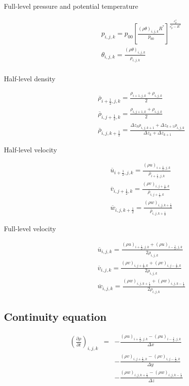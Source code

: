 \begin{description}
\item[Full-level pressure and potential temperature]
\begin{eqnarray}
&&p_{i,j,k}=p_{00}\left[\frac{(\rho \theta)_{i,j,k} R^*}{p_{00}} \right]^{\frac{c_{p}^*}{c_{p}^*- R^*}}\\
&&\theta_{i,j,k} = \frac{(\rho \theta)_{i,j,k}}{\rho_{i,j,k}} \label{eq:theta full} \\
\end{eqnarray}
\item[Half-level density]
\begin{eqnarray}
&&  \overline{\rho}_{i+\frac{1}{2},j,k} = \frac{\rho_{i+1,j,k}+\rho_{i,j,k}}{2} \label{eq:rho half i} \\
&&  \overline{\rho}_{i,j+\frac{1}{2},k} = \frac{\rho_{i,j+1,k}+\rho_{i,j,k}}{2} \label{eq:rho half j} \\
&&  \overline{\rho}_{i,j,k+\frac{1}{2}} = \frac{\Delta z_k\rho_{i,j,k+1}+\Delta z_{k+1}\rho_{i,j,k}}{\Delta z_k + \Delta z_{k+1}} \label{eq:rho half k}
\end{eqnarray}
\item[Half-level velocity]
\begin{eqnarray}
&&  \overline{u}_{i+\frac{1}{2},j,k} = \frac{(\rho u)_{i+\frac{1}{2},j,k}}{\overline{\rho}_{i+\frac{1}{2},j,k}}\\
&&  \overline{v}_{i,j+\frac{1}{2},k} = \frac{(\rho v)_{i,j+\frac{1}{2},k}}{\overline{\rho}_{i,j+\frac{1}{2},k}}\\
&&  \overline{w}_{i,j,k+\frac{1}{2}} = \frac{(\rho w)_{i,j,k+\frac{1}{2}}}{\overline{\rho}_{i,j,k+\frac{1}{2}}}
\end{eqnarray}
\item[Full-level velocity]
\begin{eqnarray}
&&  \overline{u}_{i,j,k} = \frac{(\rho u)_{i+\frac{1}{2},j,k}+(\rho u)_{i-\frac{1}{2},j,k}}{2\rho_{i,j,k}} \label{eq:u full} \\
&&  \overline{v}_{i,j,k} = \frac{(\rho v)_{i,j+\frac{1}{2},k}+(\rho v)_{i,j-\frac{1}{2},k}}{2\rho_{i,j,k}} \label{eq:v full} \\
&&  \overline{w}_{i,j,k} = \frac{(\rho w)_{i,j,k+\frac{1}{2}}+(\rho w)_{i,j,k-\frac{1}{2}}}{2\rho_{i,j,k}} \label{eq:w full}
\end{eqnarray}
\end{description}




\subsection{Continuity equation}
\begin{eqnarray}
\left(\frac{\partial \rho}{\partial t}\right)_{i,j,k}
&=& - \frac{(\rho u)_{i+\frac{1}{2},j,k} -(\rho u)_{i-\frac{1}{2},j,k}}{\Delta x}\nonumber\\
& & - \frac{(\rho v)_{i,j+\frac{1}{2},k} -(\rho v)_{i,j-\frac{1}{2},k}}{\Delta y}\nonumber\\
& & - \frac{(\rho w)_{i,j,k+\frac{1}{2}} -(\rho w)_{i,j,k-\frac{1}{2}}}{\Delta z}
\end{eqnarray}

